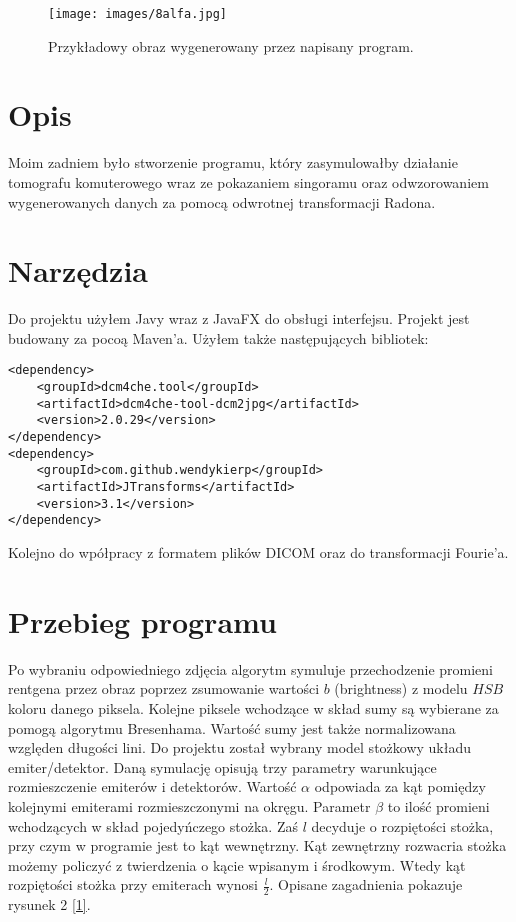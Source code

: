\documentclass{article}
\begin{document}



\begin{figure}
\begin{center}
\texttt{[image: images/8alfa.jpg]}
\end{center}
\caption{Przykładowy obraz wygenerowany przez napisany program.}
\end{figure}

\section{Opis}

\indent Moim zadniem było stworzenie programu, który zasymulowałby działanie tomografu komuterowego wraz ze pokazaniem singoramu oraz odwzorowaniem wygenerowanych danych za pomocą odwrotnej transformacji Radona. 

\section{Narzędzia}

\indent Do projektu użyłem Javy wraz z JavaFX do obsługi interfejsu. Projekt jest budowany za pocoą Maven'a. Użyłem także następujących bibliotek:

\begin{lstlisting}[frame=single]  
 <dependency>
	<groupId>dcm4che.tool</groupId>
	<artifactId>dcm4che-tool-dcm2jpg</artifactId>
	<version>2.0.29</version>
</dependency>
<dependency>
	<groupId>com.github.wendykierp</groupId>
	<artifactId>JTransforms</artifactId>
	<version>3.1</version>
</dependency>
\end{lstlisting}
Kolejno do wpółpracy z formatem plików DICOM oraz do transformacji Fourie'a.

\section{Przebieg programu}
Po wybraniu odpowiedniego zdjęcia algorytm symuluje przechodzenie promieni rentgena przez obraz poprzez zsumowanie wartości $b$ (brightness) z modelu $HSB$ koloru danego piksela. Kolejne piksele wchodzące w skład sumy są wybierane za pomogą algorytmu Bresenhama. Wartość sumy jest także normalizowana względen długości lini. Do projektu został wybrany model stożkowy układu emiter/detektor. Daną symulację opisują trzy parametry warunkujące rozmieszczenie emiterów i detektorów. Wartość $\alpha$ odpowiada za kąt pomiędzy kolejnymi emiterami rozmieszczonymi na okręgu. Parametr $\beta$ to ilość promieni wchodzących w skład pojedyńczego stożka. Zaś $l$ decyduje o rozpiętości stożka, przy czym w programie jest to kąt wewnętrzny. Kąt zewnętrzny rozwacria stożka możemy policzyć z twierdzenia o kącie wpisanym i środkowym. Wtedy kąt rozpiętości stożka przy emiterach wynosi $\frac{l}{2}$. Opisane zagadnienia pokazuje rysunek 2 \hyperlink{ramlak}{[1]}.
\end{document}
